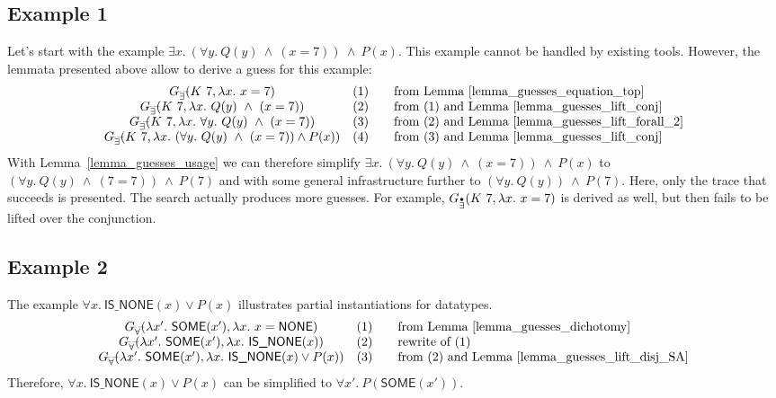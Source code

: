 \documentclass[a4paper,12pt,DIV=12,oneside]{scrbook}
\theoremstyle{definition}
\theoremstyle{remark}
\newcommand{\GEP}{\ensuremath{G_{\accentset{\bullet}{\exists}}}}
\newcommand{\GEG}{\ensuremath{G_{\accentset{\_\,\_}{\exists}}}}
\newcommand{\GUG}{\ensuremath{G_{\accentset{\_\,\_}{\forall}}}}
\begin{document}
\subsection{Example 1}
Let's start with the example 
$\exists x.\ (\forall y.\ Q(y)\ \wedge\ (x=7)) \
\wedge\ P(x)$. This example cannot be handled by
existing tools. However, the lemmata presented above allow to
derive a guess for this example:
%
\[\begin{array}{cc@{\qquad}l}
\GEG(K\ 7, \lambda x.\ x = 7) & \text{(1)} & \text{from Lemma~\ref{lemma_guesses_equation_top}} \\
\GEG(K\ 7, \lambda x.\ Q(y)\ \wedge\ (x=7)) & \text{(2)} & \text{from (1) and Lemma~\ref{lemma_guesses_lift_conj}} \\
\GEG(K\ 7, \lambda x.\ \forall y.\ Q(y)\ \wedge\ (x=7)) & \text{(3)} & \text{from (2) and Lemma~\ref{lemma_guesses_lift_forall_2}} \\
\GEG(K\ 7, \lambda x.\ (\forall y.\ Q(y)\ \wedge\ (x=7)) \wedge P(x)) & \text{(4)} & \text{from (3) and Lemma~\ref{lemma_guesses_lift_conj}}
\end{array}
\]
%
With Lemma~\ref{lemma_guesses_usage} we can therefore simplify 
$\exists x.\ (\forall y.\ Q(y)\ \wedge\ (x=7)) \ \wedge\ P(x)$ to 
$(\forall y.\ Q(y)\ \wedge\ (7=7)) \ \wedge\ P(7)$ and with some general infrastructure further to
$(\forall y.\ Q(y)) \ \wedge\ P(7)$.
Here, only the trace that succeeds is presented. The search actually produces more guesses. 
For example, $\GEP(K\ 7, \lambda x.\ x = 7)$ is derived as well, but then fails to be lifted over
the conjunction.

\subsection{Example 2}\label{subsec_Example_2}
The example $\forall x.\ \textsf{IS\_NONE}(x) \vee P(x)$ illustrates partial instantiations for datatypes.
\[\begin{array}{cc@{\qquad}l}
\GUG(\lambda x'.\ \textsf{SOME}(x'), \lambda x.\ x = \textsf{NONE}) & \text{(1)} & \text{from Lemma~\ref{lemma_guesses_dichotomy}} \\
\GUG(\lambda x'.\ \textsf{SOME}(x'), \lambda x.\ \textsf{IS\_NONE}(x)) & \text{(2)} & \text{rewrite of (1)} \\
\GUG(\lambda x'.\ \textsf{SOME}(x'), \lambda x.\ \textsf{IS\_NONE}(x) \vee P(x)) & \text{(3)} & \text{from (2) and Lemma~\ref{lemma_guesses_lift_disj_SA}} 
\end{array}
\]
Therefore, 
$\forall x.\ \textsf{IS\_NONE}(x) \vee P(x)$ can be simplified to 
$\forall x'.\ P(\textsf{SOME}(x'))$.
\end{document}
